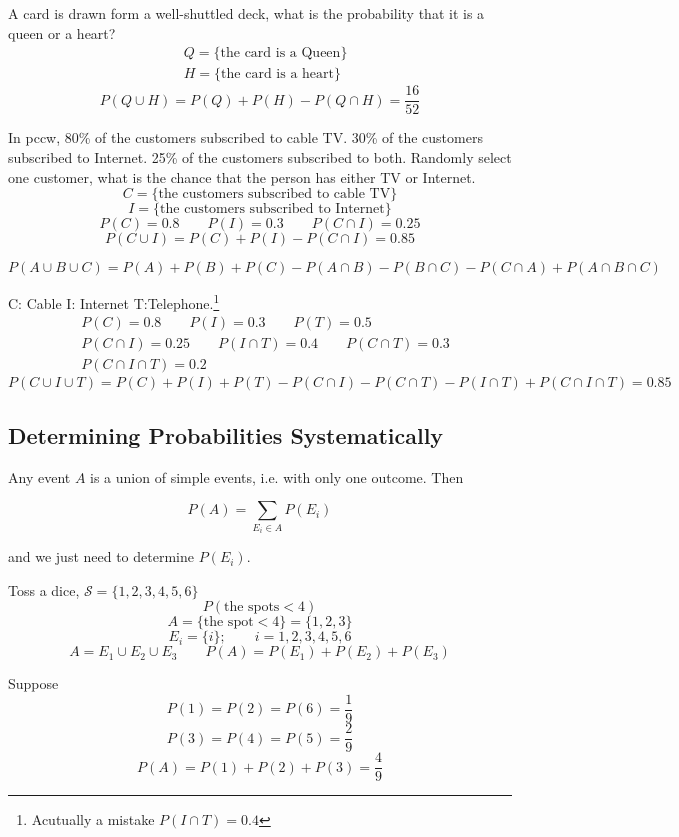 \begin{exmp}
A card is drawn form a well-shuttled deck, what is the probability that it is a queen or a heart?
\begin{align*}
&Q=\{\text{the card is a Queen}\}\\
&H=\{\text{the card is a heart}\}
\end{align*}
\[P(Q \cup H)=P(Q)+P(H)-P(Q \cap H)=\frac{16}{52}\]
\end{exmp}

\begin{exmp}
In pccw, 80\% of the customers subscribed to cable TV. 30\% of the customers subscribed to Internet. 25\% of the customers subscribed to both.
Randomly select one customer, what is the chance that the person has either TV or Internet.
\[C=\{\text{the customers subscribed to cable TV}\}\]
\[I=\{\text{the customers subscribed to Internet} \}\]
\[P(C)=0.8 \qquad P(I)=0.3 \qquad P(C\cap I)=0.25\]
\[P(C\cup I)=P(C)+P(I)-P(C\cap I)=\boxed{0.85}\]
\end{exmp}

\begin{prop}
\[ P(A \cup B \cup C)=P(A)+P(B)+P(C)-P(A \cap B)-P(B \cap C)-P(C \cap A)+P(A \cap B \cap C) \]
\end{prop}

\begin{exmp}
C: Cable \qquad I: Internet \qquad T:Telephone.\footnote{Acutually a mistake $P(I\cap T)=0.4$}
\begin{align*}
&P(C)=0.8 \qquad P(I)=0.3 \qquad P(T)=0.5	\\
&P(C\cap I)=0.25 \qquad P(I\cap T)=0.4 \qquad P(C\cap T)=0.3\\
&P(C\cap I \cap T)=0.2
\end{align*}
\[P(C\cup I \cup T)=P(C)+P(I)+P(T)-P(C \cap I)-P(C \cap T)-P(I \cap T)+P(C \cap I \cap T)=\boxed{0.85}\]
\end{exmp}

\subsection{Determining Probabilities Systematically}
Any event $A$ is a union of simple events, i.e. with only one outcome. Then

\[P(A)=\sum_{E_i \in A}P(E_i)\]

and we just need to determine $P(E_i)$.

\begin{exmp}
Toss a dice, $\mathcal{S}=\{1,2,3,4,5,6\}$
\[P(\text{the spots}<4)\]
\[A=\{\text{the spot}< 4 \}=\{1,2,3\}\]
\[E_i=\{i\};\qquad i=1,2,3,4,5,6\]
\[A=E_1 \cup E_2 \cup E_3 \qquad  P(A)=P(E_1)+P(E_2)+P(E_3)\]

Suppose 
\[P(1)=P(2)=P(6)=\frac{1}{9}\]
\[P(3)=P(4)=P(5)=\frac{2}{9}\]
\[P(A)=P(1)+P(2)+P(3)=\frac{4}{9}\]
\end{exmp}

